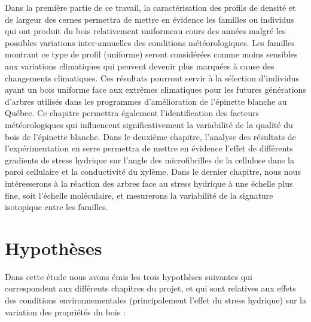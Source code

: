 \documentclass[a4paper,12pt]{report}
\begin{document}
   
Dans la première partie de ce travail, la caractérisation des profils de densité et de largeur des cernes permettra de mettre en évidence les familles ou individus qui ont produit du bois relativement \og uniforme\fg au cours des années malgré les possibles variations inter-annuelles des conditions météorologiques. Les familles montrant ce type de profil (uniforme) seront considérées comme moins sensibles aux variations climatiques qui peuvent devenir plus marquées à cause des changements climatiques. Ces résultats pourront servir à la sélection d'individus ayant un bois uniforme face aux extrêmes climatiques pour les futures générations d'arbres utilisés dans les programmes d'amélioration de l'épinette blanche au Québec. Ce chapitre permettra également l'identification des facteurs météorologiques qui influencent significativement la variabilité de la qualité du bois de l'épinette blanche. Dans le deuxième chapitre, l'analyse des résultats de l'expérimentation en serre permettra de mettre en évidence l'effet de différents gradients de stress hydrique sur l'angle des microfibrilles de la cellulose dans la paroi cellulaire et la conductivité du xylème. Dans le dernier chapitre, nous nous intéresserons à la réaction des arbres face au stress hydrique à une échelle plus fine, soit l'échelle moléculaire, et mesurerons la variabilité de la signature isotopique entre les familles. \\


\section{Hypothèses}

Dans cette étude nous avons émis les trois hypothèses suivantes qui correspondent aux différents chapitres du projet, et qui sont relatives aux effets des conditions environnementales (principalement l'effet du stress hydrique) sur la variation des propriétés du bois :\\
\end{document}
